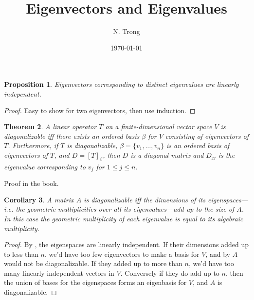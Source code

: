 \documentclass[12pt]{article}
\title{Eigenvectors and Eigenvalues}
\author{N. Trong}
\date{\today}                                           %
\theoremstyle{plain}
\newtheorem{theorem}{Theorem}
\newtheorem{corollary}[theorem]{Corollary}
\newtheorem{proposition}[theorem]{Proposition}
\theoremstyle{definition}
\theoremstyle{remark}
\begin{document}
\maketitle

\begin{proposition}\label{eigenindependence}
Eigenvectors corresponding to distinct eigenvalues are linearly independent.
\end{proposition}

\begin{proof}
Easy to show for two eigenvectors, then use induction.
\end{proof}

\begin{theorem}\label{diagonalizable}
A linear operator $T$ on a finite-dimensional vector space $V$ is diagonalizable iff there exists an ordered basis $\beta$ for $V$ consisting of eigenvectors of $T$. Furthermore, if $T$ is diagonalizable, $\beta = \{v_1,\ldots, v_n\}$ is an ordered basis of eigenvectors of $T$, and $D = [T]_\beta$, then $D$ is a diagonal matrix and $D_{jj}$ is the eigenvalue corresponding to $v_j$ for $1 \leq j \leq n$.
\end{theorem}

Proof in the book.

\begin{corollary}
A matrix $A$ is diagonalizable iff the dimensions of its eigenspaces---i.e. the geometric multiplicities over all its eigenvalues---add up to the size of $A$. In this case the geometric multiplicity of each eigenvalue is equal to its algebraic multiplicity.
\end{corollary}

\begin{proof}
By , the eigenspaces are linearly independent. If their dimensions added up to less than $n$, we'd have too few eigenvectors to make a basis for $V$, and by  $A$ would not be diagonalizable. If they added up to more than $n$, we'd have too many linearly independent vectors in $V$. Conversely if they do add up to $n$, then the union of bases for the eigenspaces forms an eigenbasis for $V$, and $A$ is diagonalizable. 
\end{proof}
\end{document}
